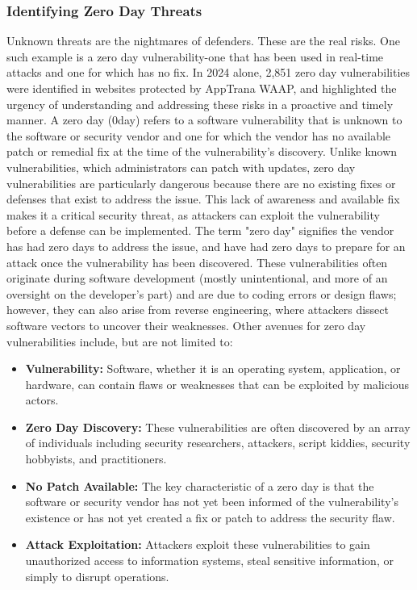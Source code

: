 \subsubsection{Identifying Zero Day Threats}
Unknown threats are the nightmares of defenders. These are the real risks. One such example is a zero day vulnerability-one that has been used in real-time attacks and one for which has no fix. In 2024 alone, 2,851 zero day vulnerabilities were identified in websites protected by AppTrana WAAP, and highlighted the urgency of understanding and addressing these risks in a proactive and timely manner.
    A zero day (0day) refers to a software vulnerability that is unknown to the software or security vendor and one for which the vendor has no available patch or remedial fix at the time of the vulnerability's discovery. Unlike known vulnerabilities, which administrators can patch with updates, zero day vulnerabilities are particularly dangerous because there are no existing fixes or defenses that exist to address the issue. This lack of awareness and available fix makes it a critical security threat, as attackers can exploit the vulnerability before a defense can be implemented. The term "zero day" signifies the vendor has had zero days to address the issue, and have had zero days to prepare for an attack once the vulnerability has been discovered. These vulnerabilities often originate during software development (mostly unintentional, and more of an oversight on the developer's part) and are due to coding errors or design flaws; however, they can also arise from reverse engineering, where attackers dissect software vectors to uncover their weaknesses. Other avenues for zero day vulnerabilities include, but are not limited to:

\begin{itemize}
    \item \textbf{Vulnerability:} Software, whether it is an operating system, application, or hardware, can contain flaws or weaknesses that can be exploited by malicious actors.
    \item \textbf{Zero Day Discovery:} These vulnerabilities are often discovered by an array of individuals including security researchers, attackers, script kiddies, security hobbyists, and practitioners.
    \item \textbf{No Patch Available:} The key characteristic of a zero day is that the software or security vendor has not yet been informed of the vulnerability's existence or has not yet created a fix or patch to address the security flaw.
    \item \textbf{Attack Exploitation:} Attackers exploit these vulnerabilities to gain unauthorized access to information systems, steal sensitive information, or simply to disrupt operations.
\end{itemize}

